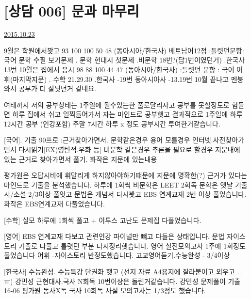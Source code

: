 \section{[상담 006] 문과 마무리}
\href{https://www.kockoc.com/Apoc/437211}{2015.10.23}

    \vspace{5mm}

    9월은 학원에서봣고 93 100 100 50 48 (동아시아/한국사) 베트남어12점
    :틀렷던문항: 국어 문학 수필 보기문제 . 문학 현대시 첫문제 .비문학 18번?(답1번이였던거)
    .한국사 13번
    10월은 집에서 응시 98 88 100 44 47 (동아시아/한국사)
    :틀렷던 문항 : 국어 어휘(마지막지문) . 수학 21.29.30 .한국사 -19번 동아시아사 -13.19번
    10월 끝나고 멘붕와서 공부가 더 잘됫던거 같네요.
    \vspace{5mm}

    여태까지 저의 공부상태는
    1주일에 될수있는한 풀로달리자고 공부를 못할정도로 힘들면
    하루 집에서 쉬고 일찍들어가서 자는 마인드로 공부햇고
    결과적으로 1주일에 하루 12시간 공부 (인강포함) 주말 7시간 하루 x 정도 공부시간 투여한거같습니다.
    \vspace{5mm}

    [국어]. 기출 90프로 :근거찾아가면서. 문학같은경우 용어 모를경우 인터넷.사전찾아가면서 다시읽기[EX)영탄적.우화 등]
    비문학 같은경우 추론을 필요로 할경우 지문내에 있는 근거로 찾아가면서 풀기. 화작은 지문에 있는내용
    \vspace{5mm}

    평가원은 오답시비에 휘말리게 하지않아야하기떄문에 지문에 명확한(?) 근거가 있다는 마인드로 기출을 분석했습니다.
    하루에 1회씩
    비문학은 LEET 2회독
    문학은 옛날 기출 시/소설 2/3이상 풀엇고
    문법은 개념서 다시봣고 EBS 연계교재 2번 이상 풀었습니다.
    화작은 EBS연계교재 다풀었습니다.
    \vspace{5mm}

    [수학]
    실모 하루에 1회씩 풀고 + 이투스 고난도 문제집 다풀었습니다.
    \vspace{5mm}

    [영어]
    EBS 연계교재 다보고 관련인강 파이널만 뺴고 다들은 상태입니다.
    문법 자이스토리 기출로 다풀고 틀렷던 부분 다시정리햇습니다.
    영어 실전모의고사 1주에 1회정도 풀었습니다
    어휘 -자이스토리 반정도했습니다.
    고교영어듣기.수능완성 - 3/4이상
    \vspace{5mm}

    [한국사]
    수능완성. 수능특강 단권화 햇고 (선지 자료 A4용지에 잘라붙이고 외우고 ..ㅠ)
    강민성 근현대사.국사 N회독 10번이상은 돌린거같습니다.
    강민성 문제풀이
    기출 16-06 평가원
    동사X독 국사 10회독
    사설 모의고사는 1/3정도 했습니다.
    \vspace{5mm}

